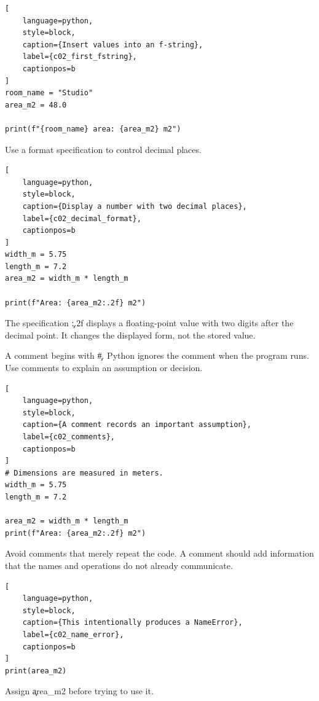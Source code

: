\begin{lstlisting}[
    language=python,
    style=block,
    caption={Insert values into an f-string},
    label={c02_first_fstring},
    captionpos=b
]
room_name = "Studio"
area_m2 = 48.0

print(f"{room_name} area: {area_m2} m2")
\end{lstlisting}

Use a format specification to control decimal places.

\begin{lstlisting}[
    language=python,
    style=block,
    caption={Display a number with two decimal places},
    label={c02_decimal_format},
    captionpos=b
]
width_m = 5.75
length_m = 7.2
area_m2 = width_m * length_m

print(f"Area: {area_m2:.2f} m2")
\end{lstlisting}

The specification \c{:.2f} displays a floating-point value with two digits
after the decimal point. It changes the displayed form, not the stored value.


A comment begins with \c{#}. Python ignores the comment when the program runs.
Use comments to explain an assumption or decision.

\begin{lstlisting}[
    language=python,
    style=block,
    caption={A comment records an important assumption},
    label={c02_comments},
    captionpos=b
]
# Dimensions are measured in meters.
width_m = 5.75
length_m = 7.2

area_m2 = width_m * length_m
print(f"Area: {area_m2:.2f} m2")
\end{lstlisting}

Avoid comments that merely repeat the code. A comment should add information
that the names and operations do not already communicate.



\begin{lstlisting}[
    language=python,
    style=block,
    caption={This intentionally produces a NameError},
    label={c02_name_error},
    captionpos=b
]
print(area_m2)
\end{lstlisting}

Assign \c{area_m2} before trying to use it.


